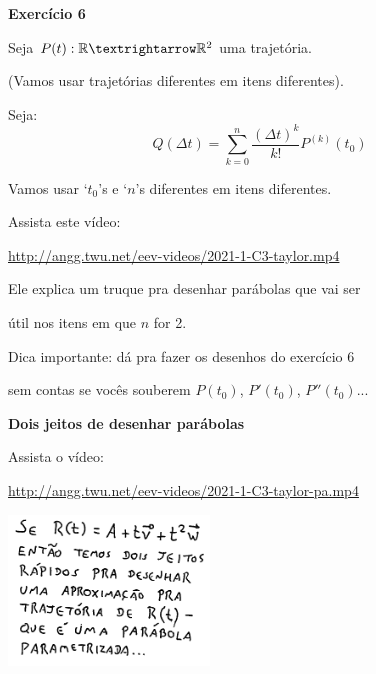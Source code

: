 \documentclass[oneside,12pt]{article}
\begin{document}
{\bf Exercício 6}

\ssk

Seja $P(t):\R→\R^2$ uma trajetória.

(Vamos usar trajetórias diferentes em itens diferentes).

Seja:
%
$$Q(Δt) = \sum_{k=0}^n \frac{(Δt)^k}{k!} P^{(k)}(t_0)$$

Vamos usar `$t_0$'s e `$n$'s diferentes em itens diferentes.

\msk

Assista este vídeo:

\ssk

{\footnotesize

\url{http://angg.twu.net/eev-videos/2021-1-C3-taylor.mp4}

}

Ele explica um truque pra desenhar parábolas que vai ser

útil nos itens em que $n$ for 2.

\msk

Dica importante: dá pra fazer os desenhos do exercício 6

sem contas se vocês souberem $P(t_0)$, $P'(t_0)$, $P''(t_0)$...



\newpage

{\bf Dois jeitos de desenhar parábolas}

\msk

Assista o vídeo:

{\footnotesize

\url{http://angg.twu.net/eev-videos/2021-1-C3-taylor-pa.mp4}

}

\bsk

\includegraphics[height=4cm]{2021-1-C3/20210707_metodo_parabola_0.pdf}

\newpage
\end{document}
